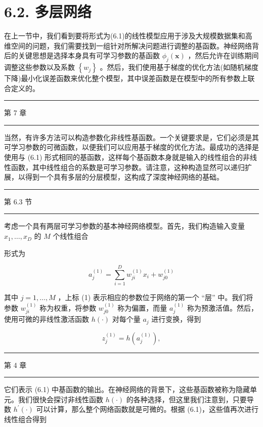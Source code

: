 \documentclass[10pt]{article}
\newcommand{\HRule}{\begin{center}\rule{0.9\linewidth}{0.2mm}\end{center}}
\begin{document}
\section*{6.2. 多层网络}

在上一节中，我们看到要将形式为(6.1)的线性模型应用于涉及大规模数据集和高维空间的问题，我们需要找到一组针对所解决问题进行调整的基函数。神经网络背后的关键思想是选择本身具有可学习参数的基函数 \({\phi }_{j}\left( \mathbf{x}\right)\) ，然后允许在训练期间调整这些参数以及系数 \(\left\{  {w}_{j}\right\}\) 。然后，我们使用基于梯度的优化方法(如随机梯度下降)最小化误差函数来优化整个模型，其中误差函数是在模型中的所有参数上联合定义的。

\HRule

第 7 章

\HRule

当然，有许多方法可以构造参数化非线性基函数。一个关键要求是，它们必须是其可学习参数的可微函数，以便我们可以应用基于梯度的优化方法。最成功的选择是使用与 (6.1) 形式相同的基函数，这样每个基函数本身就是输入的线性组合的非线性函数，其中线性组合的系数是可学习参数。请注意，这种构造显然可以递归扩展，以得到一个具有多层的分层模型，这构成了深度神经网络的基础。

\HRule

第 6.3 节

\HRule

考虑一个具有两层可学习参数的基本神经网络模型。首先，我们构造输入变量 \({x}_{1},\ldots ,{x}_{D}\) 的 \(M\) 个线性组合

形式为

\[
{a}_{j}^{\left( 1\right) } = \mathop{\sum }\limits_{{i = 1}}^{D}{w}_{ji}^{\left( 1\right) }{x}_{i} + {w}_{j0}^{\left( 1\right) } \tag{6.7}
\]

其中 \(j = 1,\ldots ,M\) ，上标 (1) 表示相应的参数位于网络的第一个 “层” 中。我们将参数 \({w}_{ji}^{\left( 1\right) }\) 称为权重，将参数 \({w}_{j0}^{\left( 1\right) }\) 称为偏置，而量 \({a}_{j}^{\left( 1\right) }\) 称为预激活值。然后，使用可微的非线性激活函数 \(h\left( \cdot \right)\) 对每个量 \({a}_{j}\) 进行变换，得到

\[
{z}_{j}^{\left( 1\right) } = h\left( {a}_{j}^{\left( 1\right) }\right) , \tag{6.8}
\]

\HRule

第 4 章

\HRule

它们表示 (6.1) 中基函数的输出。在神经网络的背景下，这些基函数被称为隐藏单元。我们很快会探讨非线性函数 \(h\left( \cdot \right)\) 的各种选择，但这里我们注意到，只要导数 \({h}^{\prime }\left( \cdot \right)\) 可以计算，那么整个网络函数就是可微的。根据 (6.1)，这些值再次进行线性组合得到
\end{document}
